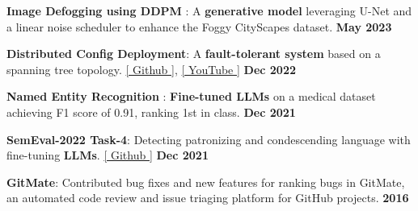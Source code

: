 \begin{zitemize}
\item \textbf{Image Defogging using DDPM} : A \textbf{generative model} leveraging U-Net and a linear noise scheduler to enhance the Foggy CityScapes dataset.  \hfill \textbf{May 2023}
\item \textbf{Distributed Config Deployment}: A \textbf{fault-tolerant system} based on a spanning tree topology. \href{https://github.com/tushar-rishav/CSCI5273_Final_Project}{[ Github ]}, \href{https://www.youtube.com/watch?v=tZjVTBsGzvQ}{[ YouTube ]}  \hfill \textbf{Dec 2022}
\item \textbf{Named Entity Recognition} : \textbf{Fine-tuned LLMs} on a medical dataset achieving F1 score of 0.91, ranking 1st in class.  \hfill \textbf{Dec 2021}
\item \textbf{SemEval-2022 Task-4}: Detecting patronizing and condescending language with fine-tuning \textbf{LLMs}. \href{https://github.com/tushar-rishav/SemEval-2022}{[ Github ]} \hfill \textbf{Dec 2021}
\item  \textbf{GitMate}: Contributed bug fixes and new features for ranking bugs in GitMate, an automated code review and issue triaging platform for GitHub projects.  \hfill \textbf{2016}
\vspace{1mm}
\end{zitemize}


